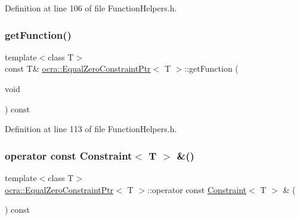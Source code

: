 Definition at line 106 of file Function\+Helpers.\+h.

\hypertarget{classocra_1_1EqualZeroConstraintPtr_a1bda9fdd004966597bca96f60e4c5b91}{}\label{classocra_1_1EqualZeroConstraintPtr_a1bda9fdd004966597bca96f60e4c5b91} 
\subsubsection{\texorpdfstring{get\+Function()}{getFunction()}\hspace{0.1cm}{\footnotesize\ttfamily [2/2]}}
{\footnotesize\ttfamily template$<$class T$>$ \\
const T\& \hyperlink{classocra_1_1EqualZeroConstraintPtr}{ocra\+::\+Equal\+Zero\+Constraint\+Ptr}$<$ T $>$\+::get\+Function (\begin{DoxyParamCaption}\item[{void}]{ }\end{DoxyParamCaption}) const\hspace{0.3cm}{\ttfamily [inline]}}



Definition at line 113 of file Function\+Helpers.\+h.

\hypertarget{classocra_1_1EqualZeroConstraintPtr_a8b8ad981759d5531f699ee2faf687c91}{}\label{classocra_1_1EqualZeroConstraintPtr_a8b8ad981759d5531f699ee2faf687c91} 
\subsubsection{\texorpdfstring{operator const Constraint$<$ T $>$ \&()}{operator const Constraint< T > \&()}}
{\footnotesize\ttfamily template$<$class T$>$ \\
\hyperlink{classocra_1_1EqualZeroConstraintPtr}{ocra\+::\+Equal\+Zero\+Constraint\+Ptr}$<$ T $>$\+::operator const \hyperlink{classocra_1_1Constraint}{Constraint}$<$ T $>$ \& (\begin{DoxyParamCaption}{ }\end{DoxyParamCaption}) const\hspace{0.3cm}{\ttfamily [inline]}}



